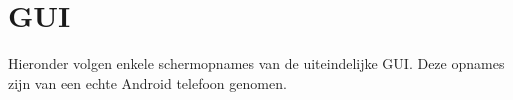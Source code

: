 \documentclass[11pt,a4paper]{article}
\begin{document}
\section{GUI}
	Hieronder volgen enkele schermopnames van de uiteindelijke GUI. Deze opnames zijn van een echte Android telefoon genomen.  \\ \newline
	\hspace*{-5pt}
\end{document}
